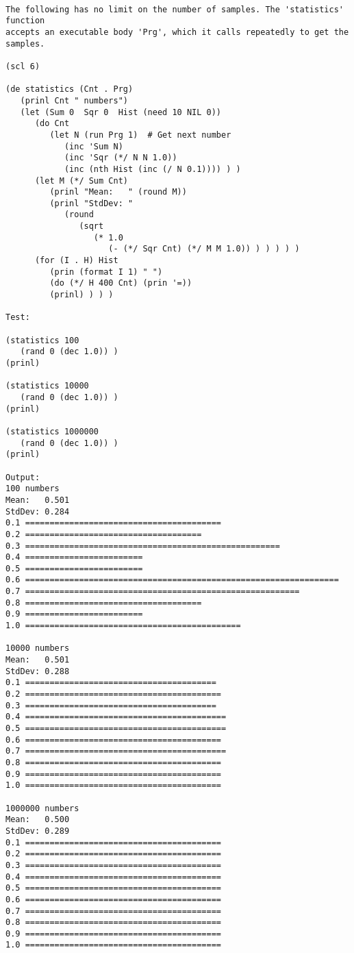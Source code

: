 \begin{verbatim}

The following has no limit on the number of samples. The 'statistics' function
accepts an executable body 'Prg', which it calls repeatedly to get the samples.

(scl 6)

(de statistics (Cnt . Prg)
   (prinl Cnt " numbers")
   (let (Sum 0  Sqr 0  Hist (need 10 NIL 0))
      (do Cnt
         (let N (run Prg 1)  # Get next number
            (inc 'Sum N)
            (inc 'Sqr (*/ N N 1.0))
            (inc (nth Hist (inc (/ N 0.1)))) ) )
      (let M (*/ Sum Cnt)
         (prinl "Mean:   " (round M))
         (prinl "StdDev: "
            (round
               (sqrt
                  (* 1.0
                     (- (*/ Sqr Cnt) (*/ M M 1.0)) ) ) ) ) )
      (for (I . H) Hist
         (prin (format I 1) " ")
         (do (*/ H 400 Cnt) (prin '=))
         (prinl) ) ) )

Test:

(statistics 100
   (rand 0 (dec 1.0)) )
(prinl)

(statistics 10000
   (rand 0 (dec 1.0)) )
(prinl)

(statistics 1000000
   (rand 0 (dec 1.0)) )
(prinl)

Output:
100 numbers
Mean:   0.501
StdDev: 0.284
0.1 ========================================
0.2 ====================================
0.3 ====================================================
0.4 ========================
0.5 ========================
0.6 ================================================================
0.7 ========================================================
0.8 ====================================
0.9 ========================
1.0 ============================================

10000 numbers
Mean:   0.501
StdDev: 0.288
0.1 =======================================
0.2 ========================================
0.3 =======================================
0.4 =========================================
0.5 =========================================
0.6 ========================================
0.7 =========================================
0.8 ========================================
0.9 ========================================
1.0 ========================================

1000000 numbers
Mean:   0.500
StdDev: 0.289
0.1 ========================================
0.2 ========================================
0.3 ========================================
0.4 ========================================
0.5 ========================================
0.6 ========================================
0.7 ========================================
0.8 ========================================
0.9 ========================================
1.0 ========================================

\end{verbatim}

